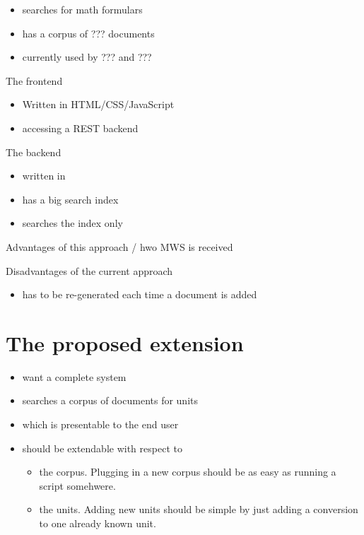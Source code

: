 \documentclass[11pt]{article}
\begin{document}
\begin{itemize}
  \item searches for math formulars
  \item has a corpus of ???  documents
  \item currently used by ??? and ??? 
\end{itemize}

The frontend
\begin{itemize}
  \item Written in HTML/CSS/JavaScript
  \item accessing a REST backend
\end{itemize}

The backend
\begin{itemize}
  \item written in 
  \item has a big search index
  \item searches the index only
\end{itemize}



Advantages of this approach / hwo MWS is received

Disadvantages of the current approach
\begin{itemize}
  \item has to be re-generated each time a document is added
\end{itemize}

\section{The proposed extension}
\label{sec:extension}

\begin{itemize}
  \item want a complete system
  \item searches a corpus of documents for units
  \item which is presentable to the end user
  \item should be extendable with respect to
  \begin{itemize}
    \item the corpus. Plugging in a new corpus should be as easy as running a script somehwere.
    \item the units. Adding new units should be simple by just adding a conversion to one already known unit.
  \end{itemize}
\end{itemize}
\end{document}
